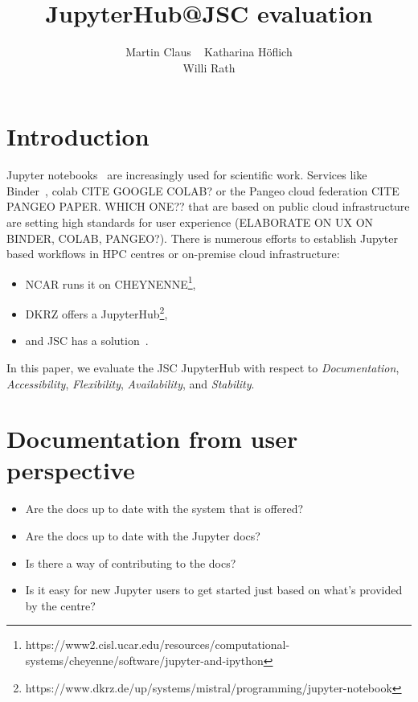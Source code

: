 \documentclass[11pt,a4paper]{article}
\title{\textbf{JupyterHub@JSC evaluation}}
\author{
  Martin Claus \ %
	Katharina Höflich \\
	Willi Rath}
\begin{document}
\maketitle


%


\section{Introduction}
\label{s-introductoin}

Jupyter notebooks~\citet{Kluyver2016} are increasingly used for scientific work.
Services like Binder~\citet{Jupyter2018}, colab CITE GOOGLE COLAB? or the Pangeo cloud federation CITE PANGEO PAPER. WHICH ONE?? that are based on public cloud infrastructure are setting high standards for user experience (ELABORATE ON UX ON BINDER, COLAB, PANGEO?).
There is numerous efforts to establish Jupyter based workflows in HPC centres or on-premise cloud infrastructure:
\begin{itemize}
  \item NCAR runs it on CHEYNENNE\footnote{https://www2.cisl.ucar.edu/resources/computational-systems/cheyenne/software/jupyter-and-ipython},
  \item DKRZ offers a JupyterHub\footnote{https://www.dkrz.de/up/systems/mistral/programming/jupyter-notebook},
  \item and JSC has a solution~\citet{Goebbert2018}.
\end{itemize}

In this paper, we evaluate the JSC JupyterHub with respect to {\em Documentation}, {\em Accessibility}, {\em Flexibility}, {\em Availability}, and {\em Stability}.


\section{Documentation from user perspective}
\label{s-doc-from-user-pov}

\begin{itemize}
	\item Are the docs up to date with the system that is offered?
	\item Are the docs up to date with the Jupyter docs?
	\item Is there a way of contributing to the docs?
	\item Is it easy for new Jupyter users to get started just based on what's provided by the centre?
\end{itemize}
\end{document}
